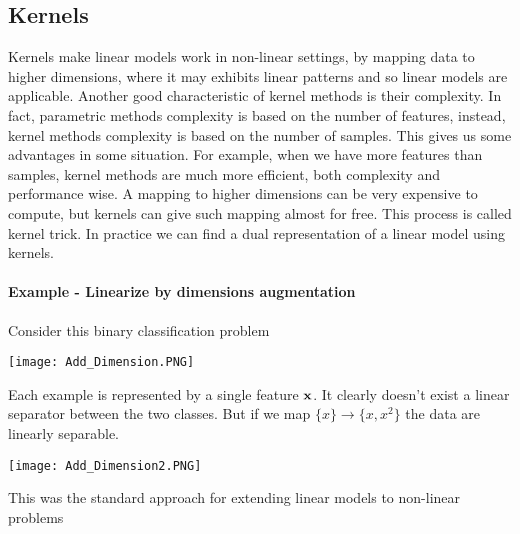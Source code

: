 \documentclass[main.tex]{subfiles}
\begin{document}
\subsection{Kernels}
Kernels make linear models work in non-linear settings, by mapping data to higher dimensions, where it may exhibits linear patterns and so linear models are applicable. Another good characteristic of kernel methods is their complexity. In fact, parametric methods complexity is based on the number of features, instead, kernel methods complexity is based on the number of samples. This gives us some advantages in some situation. For example, when we have more features than samples, kernel methods are much more efficient, both complexity and performance wise.
A mapping to higher dimensions can be very expensive to compute, but kernels can give such mapping almost for free. This process is called kernel trick. In practice we can find a dual representation of a linear model using kernels.
\paragraph{Example - Linearize by dimensions augmentation} Consider this binary classification problem

\begin{center}
    \texttt{[image: Add\_Dimension.PNG]}
\end{center}

Each example is represented by a single feature $\textbf{x}$. It clearly doesn't exist a linear separator between the two classes. But if we map $\{x\} \rightarrow \{x,x^2\}$ the data are linearly separable.

\begin{center}
    \texttt{[image: Add\_Dimension2.PNG]}
\end{center}
This was the standard approach for extending linear models to non-linear problems
\end{document}
